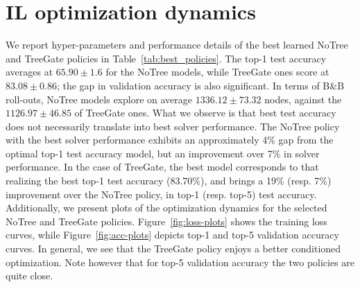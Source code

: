 \documentclass[letterpaper]{article} %
\begin{document}
\section{IL optimization dynamics}
\label{app:il-opt}

{We report hyper-parameters and performance details of the best learned NoTree and TreeGate policies in Table~\ref{tab:best_policies}. The top-1 test accuracy averages at $65.90 \pm 1.6$ for the NoTree models, while TreeGate ones score at $83.08 \pm 0.86$; the gap in validation accuracy is also significant. In terms of B\&B roll-outs, NoTree models explore on average $1336.12 \pm 73.32$ nodes, against the $1126.97 \pm 46.85$ of TreeGate ones.
What we observe is that best test accuracy does not necessarily translate into best solver performance. The NoTree policy with the best solver performance exhibits an approximately 4\% gap from the optimal top-1 test accuracy model, but an improvement over 7\% in solver performance. In the case of TreeGate, the best model corresponds to that realizing the best top-1 test accuracy (83.70\%), and brings a 19\% (resp. 7\%) improvement over the NoTree policy, in top-1 (resp. top-5) test accuracy.
Additionally, we present plots of the optimization dynamics for the selected NoTree and TreeGate policies. Figure~\ref{fig:loss-plots} shows the training loss curves, while Figure~\ref{fig:acc-plots} depicts top-1 and top-5 validation accuracy curves. In general, we see that the TreeGate policy enjoys a better conditioned optimization. Note however that for top-5 validation accuracy the two policies are quite close.
}
\end{document}

